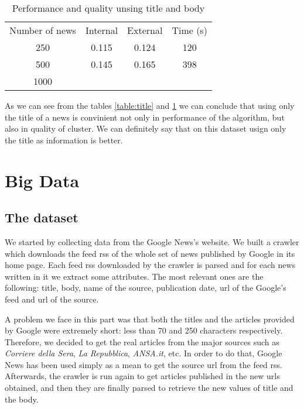 \documentclass{acm_proc_article-sp}
\begin{document}
\begin{table}[!ht]
\centering
\label{table:body}
\begin{tabular}{cccc}
Number of news & Internal & External & Time (s) \\
250            & 0.115    & 0.124    & 120      \\
500            & 0.145    & 0.165    & 398      \\
1000           &          &          &   
\end{tabular}
\caption{Performance and quality unsing title and body}
\end{table}


As we can see from the tables \ref{table:title} and \ref{table:body} we can conclude that using only the title of a news is convinient not only in performance of the algorithm, but also in quality of cluster. We can definitely say that on this dataset usign only the title as information is better.





\section{Big Data}
\vspace{2mm}

\subsection{The dataset}
\vspace{2mm}
We started by collecting data from the Google News's website. We built a crawler which downloads the feed rss of the whole set of news published by Google in its home page.
Each feed rss downloaded by the crawler is parsed and for each news written in it we extract some attributes. The most relevant ones are the following: title, body, name of the source, publication date, url of the Google's feed and url of the source.

A problem we face in this part was that both the titles and the articles provided by Google were extremely short: less than 70 and 250 characters respectively. Therefore, we decided to get the real articles from the major sources such as \textit{Corriere della Sera}, \textit{La Repubblica}, \textit{ANSA.it}, etc. In order to do that, Google News has been used simply as a mean to get the source url from the feed rss. Afterwards, the crawler is run again to get articles published in the new urls obtained, and then they are finally parsed to retrieve the new values of title and the body.
\end{document}
